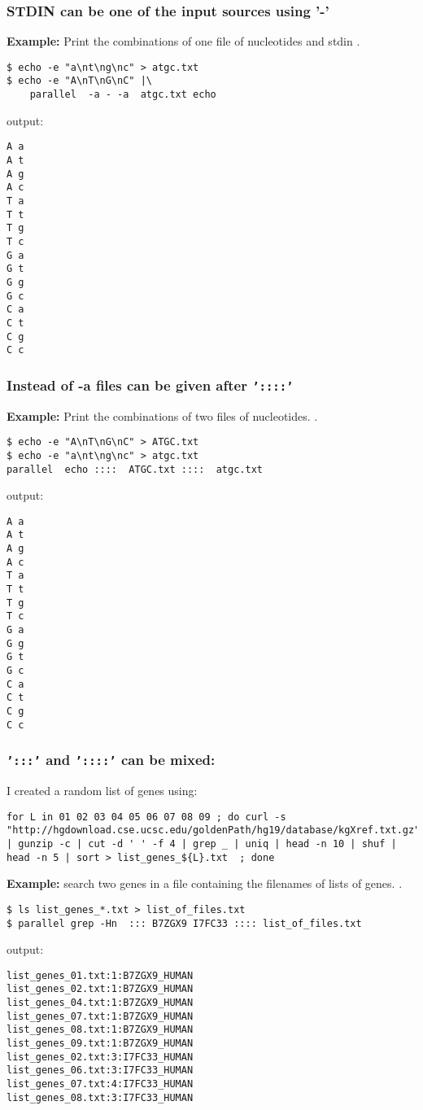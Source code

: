 \documentclass{article}
\newcommand{\example}[1]{
\textbf{Example: } {\color[rgb]{0,0,1} #1 } .
}
\newcommand{\cmdoption}[1]{\texttt{'#1'}}
\begin{document}
\subsubsection{STDIN can be one of the input sources using '-'}
\example{Print the combinations of one file of nucleotides and stdin }
\begin{lstlisting}
$ echo -e "a\nt\ng\nc" > atgc.txt
$ echo -e "A\nT\nG\nC" |\
	parallel  -a - -a  atgc.txt echo
\end{lstlisting}
output:
\begin{lstlisting}
A a
A t
A g
A c
T a
T t
T g
T c
G a
G t
G g
G c
C a
C t
C g
C c
\end{lstlisting}



\subsubsection{Instead of -a files can be given after \cmdoption{::::}}
\example{Print the combinations of two files of nucleotides. }
\begin{lstlisting}
$ echo -e "A\nT\nG\nC" > ATGC.txt
$ echo -e "a\nt\ng\nc" > atgc.txt
parallel  echo ::::  ATGC.txt ::::  atgc.txt
\end{lstlisting}
output:
\begin{lstlisting}
A a
A t
A g
A c
T a
T t
T g
T c
G a
G g
G t
G c
C a
C t
C g
C c
\end{lstlisting}

\subsubsection{\cmdoption{:::} and \cmdoption{::::} can be mixed:}
I created a random list of genes using:
\begin{lstlisting}
for L in 01 02 03 04 05 06 07 08 09 ; do curl -s "http://hgdownload.cse.ucsc.edu/goldenPath/hg19/database/kgXref.txt.gz" | gunzip -c | cut -d '	' -f 4 | grep _ | uniq | head -n 10 | shuf | head -n 5 | sort > list_genes_${L}.txt  ; done
\end{lstlisting}


\example{search two genes in a file containing the filenames of lists of genes.}
\begin{lstlisting}
$ ls list_genes_*.txt > list_of_files.txt
$ parallel grep -Hn  ::: B7ZGX9 I7FC33 :::: list_of_files.txt
\end{lstlisting}
output:
\begin{lstlisting}
list_genes_01.txt:1:B7ZGX9_HUMAN
list_genes_02.txt:1:B7ZGX9_HUMAN
list_genes_04.txt:1:B7ZGX9_HUMAN
list_genes_07.txt:1:B7ZGX9_HUMAN
list_genes_08.txt:1:B7ZGX9_HUMAN
list_genes_09.txt:1:B7ZGX9_HUMAN
list_genes_02.txt:3:I7FC33_HUMAN
list_genes_06.txt:3:I7FC33_HUMAN
list_genes_07.txt:4:I7FC33_HUMAN
list_genes_08.txt:3:I7FC33_HUMAN
\end{lstlisting}
\end{document}
